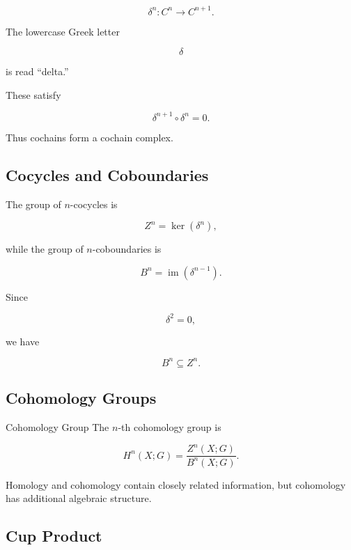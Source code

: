 \[
\boxed{
\delta^n:
C^n
\to
C^{n+1}.
}
\]

The lowercase Greek letter

\[
\delta
\]

is read ``delta.''

These satisfy

\[
\boxed{
\delta^{n+1}\circ\delta^n=0.
}
\]

Thus cochains form a cochain complex.

\subsection{Cocycles and Coboundaries}
\label{subsec:cocycles-coboundaries}

The group of \(n\)-cocycles is

\[
\boxed{
Z^n
=
\ker(\delta^n),
}
\]

while the group of \(n\)-coboundaries is

\[
\boxed{
B^n
=
\operatorname{im}(\delta^{n-1}).
}
\]

Since

\[
\delta^2=0,
\]

we have

\[
\boxed{
B^n\subseteq Z^n.
}
\]

\subsection{Cohomology Groups}
\label{subsec:cohomology-groups}

\begin{definitionbox}{Cohomology Group}
The \(n\)-th cohomology group is

\[
\boxed{
H^n(X;G)
=
\frac{
Z^n(X;G)
}{
B^n(X;G)
}.
}
\]
\end{definitionbox}

Homology and cohomology contain closely related information, but cohomology
has additional algebraic structure.

\subsection{Cup Product}
\label{subsec:cup-product}

